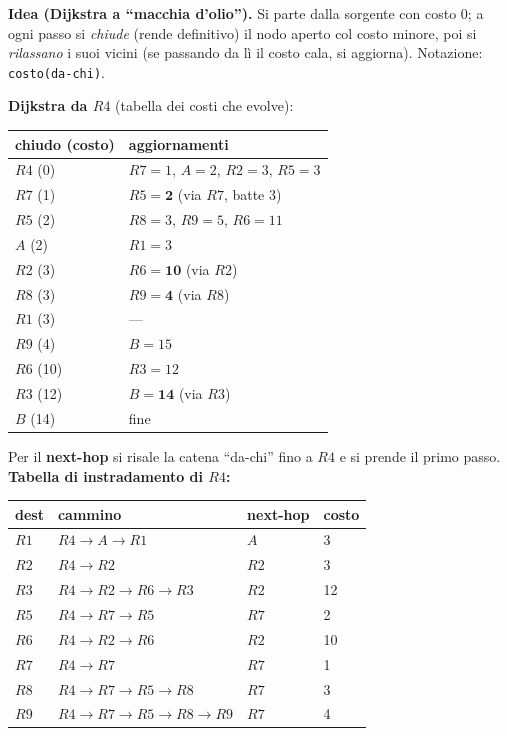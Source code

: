 \documentclass{report}
\begin{document}
\begin{solution}
\textbf{Idea (Dijkstra a ``macchia d'olio'').} Si parte dalla sorgente con costo
$0$; a ogni passo si \emph{chiude} (rende definitivo) il nodo aperto col costo
minore, poi si \emph{rilassano} i suoi vicini (se passando da lì il costo cala, si
aggiorna). Notazione: \texttt{costo(da-chi)}.

\medskip
\noindent\textbf{Dijkstra da $R4$} (tabella dei costi che evolve):
\begin{center}
\begin{tabular}{l l}
\hline
chiudo (costo) & aggiornamenti \\
\hline
$R4$ (0)  & $R7{=}1$, $A{=}2$, $R2{=}3$, $R5{=}3$ \\
$R7$ (1)  & $R5{=}\mathbf{2}$ (via $R7$, batte 3) \\
$R5$ (2)  & $R8{=}3$, $R9{=}5$, $R6{=}11$ \\
$A$ (2)   & $R1{=}3$ \\
$R2$ (3)  & $R6{=}\mathbf{10}$ (via $R2$) \\
$R8$ (3)  & $R9{=}\mathbf{4}$ (via $R8$) \\
$R1$ (3)  & --- \\
$R9$ (4)  & $B{=}15$ \\
$R6$ (10) & $R3{=}12$ \\
$R3$ (12) & $B{=}\mathbf{14}$ (via $R3$) \\
$B$ (14)  & fine \\
\hline
\end{tabular}
\end{center}

\noindent Per il \textbf{next-hop} si risale la catena ``da-chi'' fino a $R4$ e si
prende il primo passo. \textbf{Tabella di instradamento di $R4$:}
\begin{center}
\begin{tabular}{l l l l}
\hline
dest & cammino & next-hop & costo \\
\hline
$R1$ & $R4\!\to\!A\!\to\!R1$ & $A$ & 3 \\
$R2$ & $R4\!\to\!R2$ & $R2$ & 3 \\
$R3$ & $R4\!\to\!R2\!\to\!R6\!\to\!R3$ & $R2$ & 12 \\
$R5$ & $R4\!\to\!R7\!\to\!R5$ & $R7$ & 2 \\
$R6$ & $R4\!\to\!R2\!\to\!R6$ & $R2$ & 10 \\
$R7$ & $R4\!\to\!R7$ & $R7$ & 1 \\
$R8$ & $R4\!\to\!R7\!\to\!R5\!\to\!R8$ & $R7$ & 3 \\
$R9$ & $R4\!\to\!R7\!\to\!R5\!\to\!R8\!\to\!R9$ & $R7$ & 4 \\
\hline
\end{tabular}
\end{center}


\end{solution}
\end{document}
